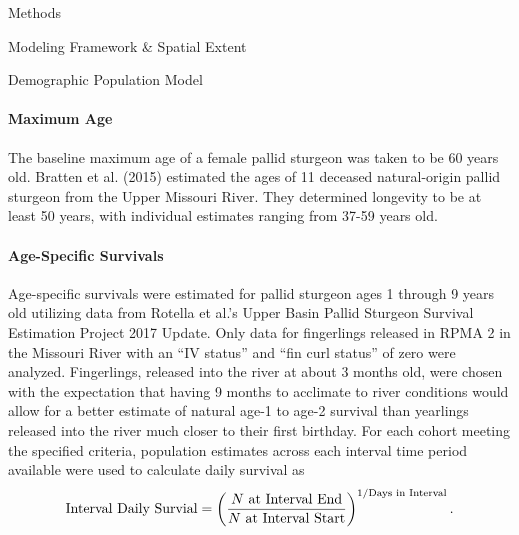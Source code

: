 \documentclass[12pt]{article}
\begin{document}
\begin{section}{Methods}
\begin{subsection}{Modeling Framework \& Spatial Extent}
\begin{subsubsection}{Demographic Population Model}
\paragraph{Maximum Age}
The baseline maximum age of a female pallid sturgeon was taken to be 60 years old.  Bratten et al. (2015) estimated the ages of 11 deceased natural-origin pallid sturgeon from the Upper Missouri River.  They determined longevity to be at least 50 years, with individual estimates ranging from 37-59 years old.\\

\paragraph{Age-Specific Survivals}
Age-specific survivals were estimated for pallid sturgeon ages 1 through 9 years old utilizing data from Rotella et al.'s Upper Basin Pallid Sturgeon Survival Estimation Project 2017 Update.  Only data for fingerlings released in RPMA 2 in the Missouri River with an ``IV status'' and ``fin curl status'' of zero were analyzed.  Fingerlings, released into the river at about 3 months old, were chosen with the expectation that having 9 months to acclimate to river conditions would allow for a better estimate of natural age-1 to age-2 survival than yearlings released into the river much closer to their first birthday.  For each cohort meeting the specified criteria, population estimates across each interval time period available were used to calculate daily survival as
\begin{equation}
\mbox{Interval Daily Survial}=\left(\frac{N \mbox{ at Interval End}}{N \mbox{ at Interval Start}}\right)^{1/\mbox{{\scriptsize Days in Interval}}}.
\end{equation}


\end{subsubsection}
\end{subsection}
\end{section}
\end{document}
